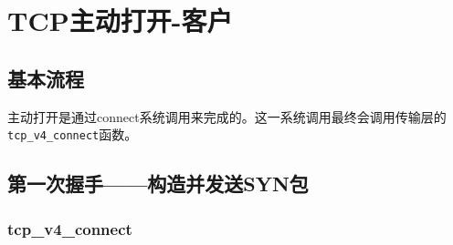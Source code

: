 \section{TCP主动打开-客户}
        \subsection{基本流程}
        主动打开是通过connect系统调用来完成的。这一系统调用最终会调用传输层的\texttt{tcp_v4_connect}函数。
        \subsection{第一次握手——构造并发送SYN包}
\subsubsection{tcp\_v4\_connect}


